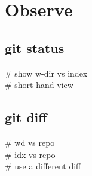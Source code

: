 \section{Observe}

\subsection*{git status}
 \# show w-dir vs index \\
 \# short-hand view \\


\subsection*{git diff}
 \# wd vs repo \\
 \# idx vs repo \\
 \# use a different diff \\


